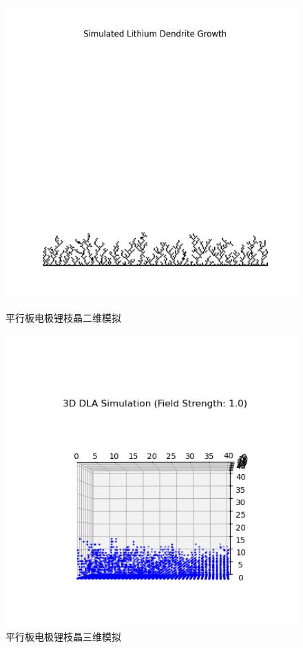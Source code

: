 \documentclass{article}
\begin{document}
\begin{figure}[H]
\begin{minipage}{0.32\textwidth}
       \end{minipage}
                \hfill %
                \begin{minipage}{0.32\textwidth}
                    \centering
                    \includegraphics[scale=0.35]{figs/11.png}
                    \caption{平行板电极锂枝晶二维模拟}
                \end{minipage}
                \hfill %
                \begin{minipage}{0.32\textwidth}
                   \centering
                  \includegraphics[scale=0.4]{figs/9.png}

                   \caption{平行板电极锂枝晶三维模拟}
                \end{minipage}
       \end{figure}         
\end{document}
